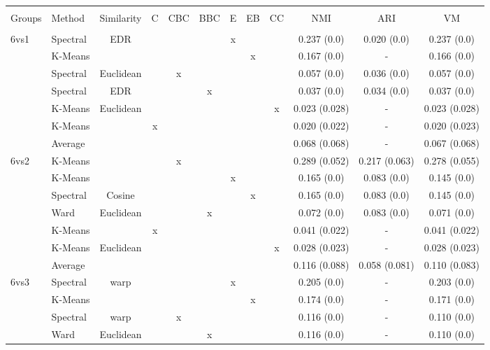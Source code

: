 \documentclass[12pt,a4paper,bibliography=totocnumbered,listof=totocnumbered]{scrartcl}
\begin{document}
{\begin{appendix}
\begin{table}[!htbp] \centering 
	\caption{} 
	\label{} 
	\scriptsize 
	\begin{tabular}{@{\extracolsep{0pt}} llcccccccccc} 
		\\[-1.8ex]\hline 
		\hline \\[-1.8ex] 
		Groups & Method & Similarity & C & CBC & BBC & E & EB & CC & NMI & ARI & VM \\ 
		\hline \\[-1.8ex] 
		6vs1 & Spectral & EDR &  &  &  & x &  &  & 0.237 (0.0) & 0.020 (0.0) & 0.237 (0.0) \\ 
		& K-Means &  &  &  &  &  & x &  & 0.167 (0.0) & - & 0.166 (0.0) \\ 
		& Spectral & Euclidean &  & x &  &  &  &  & 0.057 (0.0) & 0.036 (0.0) & 0.057 (0.0) \\ 
		& Spectral & EDR &  &  & x &  &  &  & 0.037 (0.0) & 0.034 (0.0) & 0.037 (0.0) \\ 
		& K-Means & Euclidean &  &  &  &  &  & x & 0.023 (0.028) & - & 0.023 (0.028) \\ 
		& K-Means &  & x &  &  &  &  &  & 0.020 (0.022) & - & 0.020 (0.023) \\ 
		& Average &  &  &  &  &  &  &  & 0.068 (0.068) & - & 0.067 (0.068) \\ 
		6vs2 & K-Means &  &  & x &  &  &  &  & 0.289 (0.052) & 0.217 (0.063) & 0.278 (0.055) \\ 
		& K-Means &  &  &  &  & x &  &  & 0.165 (0.0) & 0.083 (0.0) & 0.145 (0.0) \\ 
		& Spectral & Cosine &  &  &  &  & x &  & 0.165 (0.0) & 0.083 (0.0) & 0.145 (0.0) \\ 
		& Ward & Euclidean &  &  & x &  &  &  & 0.072 (0.0) & 0.083 (0.0) & 0.071 (0.0) \\ 
		& K-Means &  & x &  &  &  &  &  & 0.041 (0.022) & - & 0.041 (0.022) \\ 
		& K-Means & Euclidean &  &  &  &  &  & x & 0.028 (0.023) & - & 0.028 (0.023) \\ 
		& Average &  &  &  &  &  &  &  & 0.116 (0.088) & 0.058 (0.081) & 0.110 (0.083) \\ 
		6vs3 & Spectral & warp &  &  &  & x &  &  & 0.205 (0.0) & - & 0.203 (0.0) \\ 
		& K-Means &  &  &  &  &  & x &  & 0.174 (0.0) & - & 0.171 (0.0) \\ 
		& Spectral & warp &  & x &  &  &  &  & 0.116 (0.0) & - & 0.110 (0.0) \\ 
		& Ward & Euclidean &  &  & x &  &  &  & 0.116 (0.0) & - & 0.110 (0.0) \\ 

\end{tabular}
\end{table}
\end{appendix}}
\end{document}

